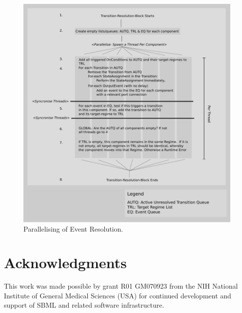 \documentclass[draftspec]{ninemlspec}
\begin{document}
\begin{figure}[htb!]
\center
\includegraphics[width=14cm]{images/ParallelisingTransitions.pdf}
\protect\caption{Parallelising of Event Resolution.}
\label{ParallelisingTransitions}
\end{figure}

\section{Acknowledgments}

This work was made possible by grant R01 GM070923 from the NIH National
Institute of General Medical Sciences (USA) for continued development and
support of SBML and related software infrastructure.


\clearpage


\end{document}

